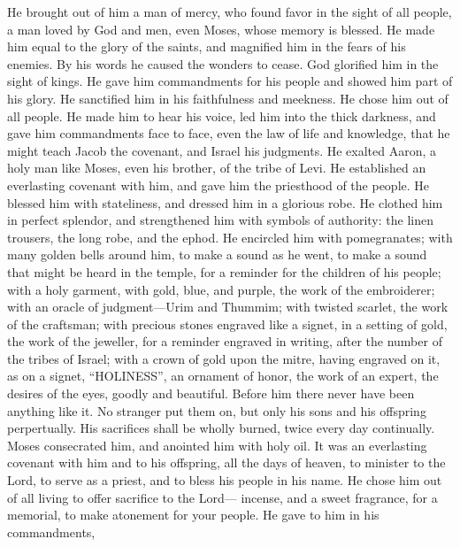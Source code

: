  He brought out of him a man of mercy, who found favor in
the sight of all people, a man loved by God and men, even Moses, whose
memory is blessed.  He made him equal to the glory of the
saints, and magnified him in the fears of his enemies.  By
his words he caused the wonders to cease. God glorified him in the sight
of kings. He gave him commandments for his people and showed him part of
his glory.  He sanctified him in his faithfulness and
meekness. He chose him out of all people.  He made him to
hear his voice, led him into the thick darkness, and gave him
commandments face to face, even the law of life and knowledge, that he
might teach Jacob the covenant, and Israel his judgments. 
He exalted Aaron, a holy man like Moses, even his brother, of the tribe
of Levi.  He established an everlasting covenant with him,
and gave him the priesthood of the people. He blessed him with
stateliness, and dressed him in a glorious robe.  He
clothed him in perfect splendor, and strengthened him with symbols of
authority: the linen trousers, the long robe, and the ephod.
 He encircled him with pomegranates; with many golden
bells around him, to make a sound as he went, to make a sound that might
be heard in the temple, for a reminder for the children of his people;
 with a holy garment, with gold, blue, and purple, the
work of the embroiderer; with an oracle of judgment---Urim and Thummim;
 with twisted scarlet, the work of the craftsman; with
precious stones engraved like a signet, in a setting of gold, the work
of the jeweller, for a reminder engraved in writing, after the number of
the tribes of Israel;  with a crown of gold upon the
mitre, having engraved on it, as on a signet, ``HOLINESS'', an ornament
of honor, the work of an expert, the desires of the eyes, goodly and
beautiful.  Before him there never have been anything
like it. No stranger put them on, but only his sons and his offspring
perpertually.  His sacrifices shall be wholly burned,
twice every day continually.  Moses consecrated him, and
anointed him with holy oil. It was an everlasting covenant with him and
to his offspring, all the days of heaven, to minister to the Lord, to
serve as a priest, and to bless his people in his name. 
He chose him out of all living to offer sacrifice to the Lord---
incense, and a sweet fragrance, for a memorial, to make atonement for
your people.  He gave to him in his commandments,
